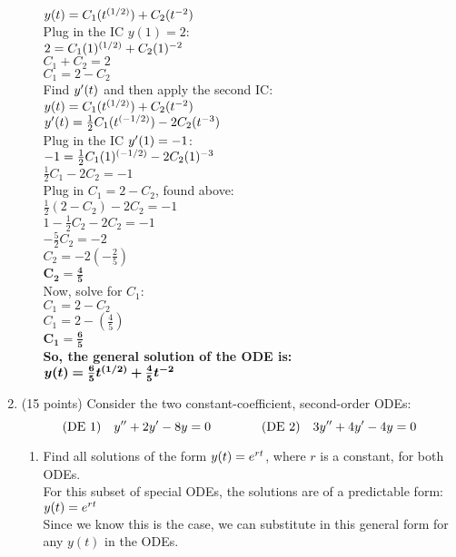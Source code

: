 \documentclass{article}
\begin{document}
\begin{enumerate}
\begin{enumerate}
$y(t)=C_1(t\sp{(1/2)})+C_2(t\sp{-2})$\\
Plug in the IC $y(1)=2$:\\
$2=C_1(1)\sp{(1/2)}+C_2(1)\sp{-2}$\\
$C_1 + C_2 = 2$\\
$C_1 = 2 - C_2$\\


Find $y\sp\prime(t)$ and then apply the second IC:\\
$y(t)=C_1(t\sp{(1/2)})+C_2(t\sp{-2})$\\
$y\sp\prime(t)=\frac{1}{2}C_1(t\sp{(-1/2)}) - 2C_2(t\sp{-3})$\\
Plug in the IC $y\sp\prime(1)=-1$:\\
$-1=\frac{1}{2}C_1(1)\sp{(-1/2)} - 2C_2(1)\sp{-3}$\\
$\frac{1}{2}C_1 - 2C_2 = -1$\\
Plug in $C_1 = 2 - C_2$, found above:\\
$\frac{1}{2}(2 - C_2) - 2C_2 = -1$\\
$1 - \frac{1}{2}C_2 - 2C_2 = -1$\\
$- \frac{5}{2}C_2 = -2$\\
$C_2 = -2(-\frac{2}{5})$\\
$\bm{C_2 = \frac{4}{5}}$\\

Now, solve for $C_1$:\\
$C_1 = 2 - C_2$\\
$C_1 = 2 - (\frac{4}{5})$\\
$\bm{C_1 = \frac{6}{5}}$\\

\textbf{So, the general solution of the ODE is:}\\
$\bm{y(t)=\frac{6}{5}t\sp{(1/2)}+\frac{4}{5}t\sp{-2}}$\\
\end{enumerate}


\bigskip
\item (15 points) Consider the two constant-coefficient, second-order ODEs:
\[
\hbox{(DE 1)}\quad y\sp{\prime\prime}+2y\sp\prime-8y=0\qquad\qquad\hbox{(DE 2)}\quad 3y\sp{\prime\prime}+4y\sp\prime-4y=0
\]
\begin{enumerate}
\item Find all solutions of the form $y(t)=e\sp{rt}$, where $r$ is a constant, for both ODEs.\\

For this subset of special ODEs, the solutions are of a predictable form: $y(t)=e\sp{rt}$\\
Since we know this is the case, we can substitute in this general form for any $y(t)$ in the ODEs.\\


\end{enumerate}
\end{enumerate}
\end{document}
